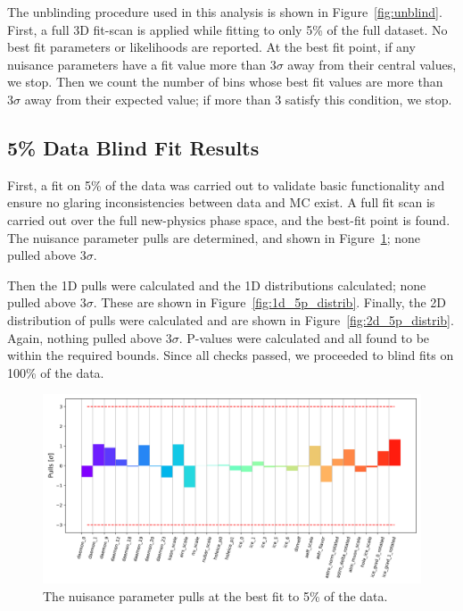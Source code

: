 \documentclass[main.tex]{subfiles}
\begin{document}
The unblinding procedure used in this analysis is shown in Figure~\ref{fig:unblind}. 
First, a full 3D fit-scan is applied while fitting to only 5\% of the full dataset. 
No best fit parameters or likelihoods are reported. 
At the best fit point, if any nuisance parameters have a fit value more than $3\sigma$ away from their central values, we stop. 
Then we count the number of bins whose best fit values are more than $3\sigma$ away from their expected value; if more than 3 satisfy this condition, we stop. 

\subsection{5\% Data Blind Fit Results}

First, a fit on 5\% of the data was carried out to validate basic functionality and ensure no glaring inconsistencies between data and MC exist. 
A full fit scan is carried out over the full new-physics phase space, and the best-fit point is found. 
The nuisance parameter pulls are determined, and shown in Figure~\ref{fig:pulls_5p}; none pulled above $3\sigma$.

Then the 1D pulls were calculated and the 1D distributions calculated; none pulled above $3\sigma$. 
These are shown in Figure~\ref{fig:1d_5p_distrib}.
Finally, the 2D distribution of pulls were calculated and are shown in Figure~\ref{fig:2d_5p_distrib}.
Again, nothing pulled above $3\sigma$. 
P-values were calculated and all found to be within the required bounds. 
Since all checks passed, we proceeded to blind fits on 100\% of the data. 

\begin{figure}
    \centering
    \includegraphics[width=0.9\linewidth]{./figures/blindfit/pulls_IC86_data_five_percent_joint_data_5p_with_flavor_update_fix.png}
    \caption{The nuisance parameter pulls at the best fit to 5\% of the data.}\label{fig:pulls_5p}
\end{figure}
\end{document}
